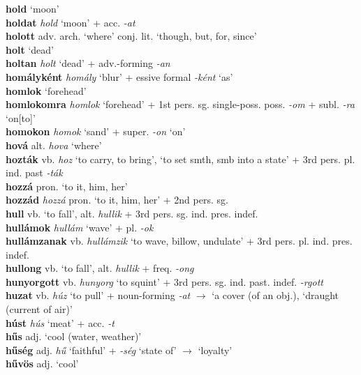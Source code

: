 \documentclass[11pt]{article}
\begin{document}
\textbf{hold} `moon' \\
\textbf{holdat} \emph{hold} `moon' + acc. \emph{-at} \\
\textbf{holott} adv. arch. `where' \textbar\textbar{}
conj. lit. `though, but, for, since' \\
\textbf{holt} `dead' \\
\textbf{holtan} \emph{holt} `dead' + adv.\hyp{}forming \emph{-an} \\
\textbf{homályként} \emph{homály} `blur' + essive formal \emph{-ként}
`as' \\
\textbf{homlok} `forehead' \\
\textbf{homlokomra} \emph{homlok} `forehead' + 1st
pers. sg. single\hyp{}poss. poss. \emph{-om} + subl. \emph{-ra}
`on[to]' \\
\textbf{homokon} \emph{homok} `sand' + super. \emph{-on} `on' \\
\textbf{hová} alt. \emph{hova} `where'  \\
\textbf{hozták} vb. \emph{hoz} `to carry, to bring', `to set smth, smb
into a state' + 3rd pers. pl. ind. past \emph{-ták} \\
\textbf{hozzá} pron. `to it, him, her' \\
\textbf{hozzád} \emph{hozzá} pron. `to it, him, her' + 2nd pers. sg. \\
\textbf{hull} vb. `to fall', alt. \emph{hullik} + 3rd
pers. sg. ind. pres. indef. \\
\textbf{hullámok} \emph{hullám} `wave' + pl. \emph{-ok} \\
\textbf{hullámzanak} vb. \emph{hullámzik} `to wave, billow, undulate' +
3rd pers. pl. ind. pres. indef. \\
\textbf{hullong} vb. `to fall', alt. \emph{hullik} + freq. \emph{-ong} \\
\textbf{hunyorgott} vb. \emph{hunyorg} `to squint' + 3rd
pers. sg. ind. past. indef. \emph{-rgott} \\
\textbf{huzat} vb. \emph{húz} `to pull' +
noun\hyp{}forming \emph{-at} $\rightarrow$ `a cover (of an obj.),
`draught (current of air)' \\
\textbf{húst} \emph{hús} `meat' + acc. \emph{-t} \\
\textbf{hűs} adj. `cool (water, weather)' \\
\textbf{hűség} adj. \emph{hű} `faithful' + \emph{-ség}
`state of' $\rightarrow$ `loyalty' \\
\textbf{hűvös} adj. `cool' \\
\ \\
\end{document}
